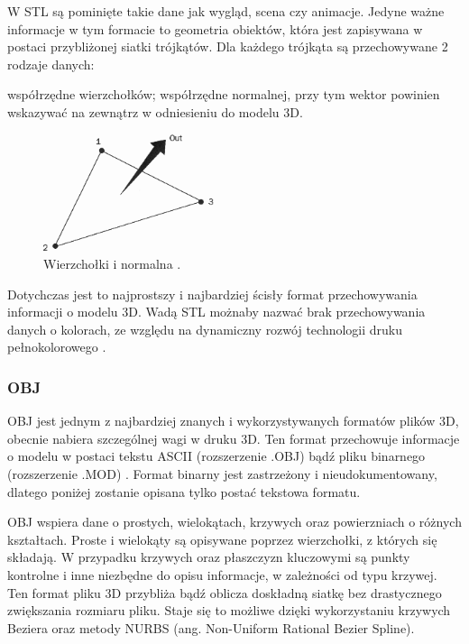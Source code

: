 W STL są pominięte takie dane jak wygląd, scena czy animacje. Jedyne ważne informacje w tym formacie to geometria obiektów, która jest zapisywana w postaci przybliżonej siatki trójkątów. Dla każdego trójkąta są przechowywane 2 rodzaje danych:
\begin{itemize}
\itemi współrzędne wierzchołków;
\itemi współrzędne normalnej, przy tym wektor powinien wskazywać na zewnątrz w odniesieniu do modelu 3D.
\end{itemize}
\begin{figure}[H]
		\centering
 		\includegraphics[width=5.0cm]{vertices-and-normal.png}
    	\caption{Wierzchołki i normalna \cite{stlinfo}.}
 		\label{rys6}
\end{figure}
 Dotychczas jest to najprostszy i najbardziej ścisły format przechowywania informacji o modelu 3D. Wadą STL możnaby nazwać brak przechowywania danych o kolorach, ze względu na dynamiczny rozwój technologii druku pełnokolorowego \cite{stlinfo}.

\subsubsection{OBJ}
OBJ jest jednym z najbardziej znanych i wykorzystywanych formatów plików 3D, obecnie nabiera szczególnej wagi w druku 3D. Ten format przechowuje informacje o modelu w postaci tekstu ASCII (rozszerzenie .OBJ) bądź pliku binarnego (rozszerzenie .MOD) \cite{objinfo}.
Format binarny jest zastrzeżony i nieudokumentowany, dlatego poniżej zostanie opisana tylko postać tekstowa formatu. 

OBJ wspiera dane o prostych, wielokątach, krzywych oraz powierzniach o różnych kształtach. Proste i wielokąty są opisywane poprzez wierzchołki, z których się składają. W przypadku krzywych oraz płaszczyzn kluczowymi są punkty kontrolne i inne niezbędne do opisu informacje, w zależności od typu krzywej. Ten format pliku 3D przybliża bądź oblicza doskładną siatkę bez drastycznego zwiększania rozmiaru pliku. Staje się to możliwe dzięki wykorzystaniu krzywych Beziera oraz metody NURBS (ang. Non-Uniform Rational Bezier Spline). 

